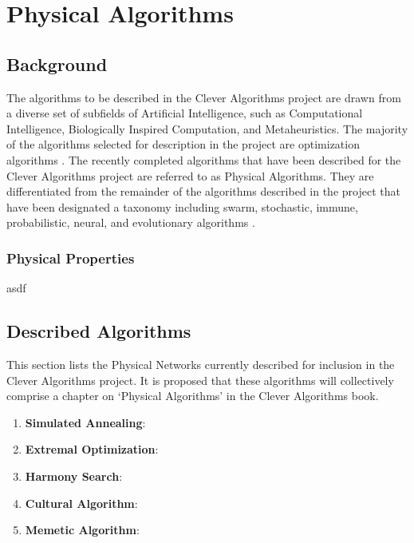 \documentclass[a4paper, 11pt]{article}
\begin{document}
\section{Physical Algorithms}
\label{sec:algorithms}

% 
% 
\subsection{Background}
The algorithms to be described in the Clever Algorithms project are drawn from a diverse set of subfields of Artificial Intelligence, such as Computational Intelligence, Biologically Inspired Computation, and Metaheuristics. The majority of the algorithms selected for description in the project are optimization algorithms \cite{Brownlee2010b}. 
The recently completed algorithms that have been described for the Clever Algorithms project are referred to as Physical Algorithms. They are differentiated from the remainder of the algorithms described in the project that have been designated a taxonomy including swarm, stochastic, immune, probabilistic, neural, and evolutionary algorithms \cite{Brownlee2010b}. 

\subsubsection{Physical Properties}
asdf


% 
% 
\subsection{Described Algorithms}
\label{subsec:algorithms}
This section lists the Physical Networks currently described for inclusion in the Clever Algorithms project. It is proposed that these algorithms will collectively comprise a chapter on `Physical Algorithms' in the Clever Algorithms book. 

\begin{enumerate}
	\item \textbf{Simulated Annealing}: \cite{}
	\item \textbf{Extremal Optimization}: \cite{}
	\item \textbf{Harmony Search}: \cite{}
	\item \textbf{Cultural Algorithm}: \cite{}
	\item \textbf{Memetic Algorithm}: \cite{}
\end{enumerate}
\end{document}
